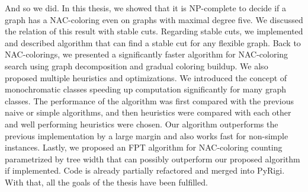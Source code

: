 And so we did.
In this thesis, we showed that it is NP-complete
to decide if a graph has a NAC-coloring even on graphs with maximal degree five.
We discussed the relation of this result with stable cuts.
Regarding stable cuts, we implemented and described algorithm that can find
a stable cut for any flexible graph.
%
Back to NAC-colorings, we presented a significantly faster algorithm
for NAC-coloring search using graph decomposition and gradual coloring buildup.
%
We also proposed multiple heuristics and optimizations.
%
We introduced the concept of monochromatic classes speeding up
computation significantly for many graph classes.
%
The performance of the algorithm was
first compared with the previous naive or simple
algorithms, and then heuristics were compared with each other and
well performing heuristics were chosen.
Our algorithm outperforms the previous implementation by a large margin
and also works fast for non-simple instances.
%
Lastly, we proposed an FPT algorithm for NAC-coloring counting
parametrized by tree width that can
possibly outperform our proposed algorithm if implemented.
%
Code is already partially refactored and merged into PyRigi.
%
With that, all the goals of the thesis have been fulfilled.

